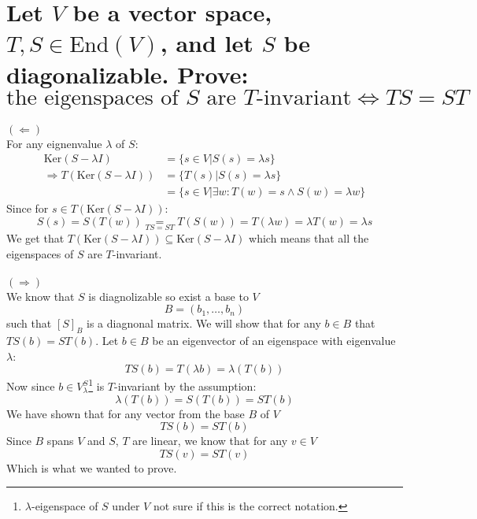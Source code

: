 \documentclass[11pt,a4paper]{article}
\theoremstyle{plain}
\newcommand{\Ker}{\text{Ker}}
\begin{document}
	\newpage
	
	\section{Let $V$ be a vector space, $T,S\in \text{End}(V)$, and let $S$ be 
	diagonalizable. Prove: 
	\[ \text{the eigenspaces of $S$ are $T$-invariant} \iff TS = ST \]}
	{$(\Leftarrow)$} \\
	For any eignenvalue $\lambda$ of $S$:
	\begin{align*}
		\Ker(S-\lambda I) &= \{s \in V \vert S(s) = \lambda s\} \\
		\Rightarrow T(\Ker(S-\lambda I)) &= \{T(s) \vert S(s) = \lambda s\} \\
		&= \{s \in V \vert \exists w\colon T(w) = s \land S(w) = \lambda w\}
	\end{align*}
	Since for $s\in T(\Ker(S-\lambda I))$:
	\[
		S(s) = S(T(w)) \underset{TS=ST}{=} T(S(w)) = T(\lambda w) = 
		\lambda T(w) = \lambda s
	\]
	We get that $T(\Ker(S-\lambda I)) \subseteq \Ker(S-\lambda I)$ which means
	that all the eigenspaces of $S$ are $T$-invariant. \\\\
	{$(\Rightarrow)$} \\
	We know that $S$ is diagnolizable so exist a base to $V$
	\[
	 B = (b_1,\dots,b_n)
	\]
	such that $[S]_B$ is a diagnonal matrix. We will show that for any $b\in B$
	that $TS(b) = ST(b)$. Let $b\in B$ be an eigenvector of an eigenspace
	with eigenvalue $\lambda$:
	\[
		TS(b) = T(\lambda b) = \lambda (T(b))
	\]
	Now since $b\in V_\lambda^S$\footnote{$\lambda$-eigenspace of $S$ under $V$
	not sure if this is the correct notation.} is $T$-invariant by the
	assumption:
	\[
		\lambda (T(b)) = S(T(b)) = ST(b)
	\]
	We have shown that for any vector from the base $B$ of $V$
	\[
		TS(b) = ST(b)
	\]
	Since $B$ spans $V$ and $S$, $T$ are linear, we know that for any $v\in V$
	\[
		TS(v) = ST(v)
	\]
	Which is what we wanted to prove.
	
	\newpage
	
\end{document}
